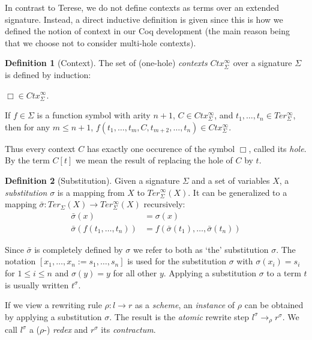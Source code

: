 \documentclass[11pt,oneside,a4paper,final]{report}
\theoremstyle{definition}
\newtheorem{definition}{Definition}
\begin{document}
In contrast to Terese, we do not define contexts as terms over an extended
signature. Instead, a direct inductive definition is given since this is how
we defined the notion of context in our Coq development (the main reason being
that we choose not to consider multi-hole contexts).

\begin{definition}[Context]
The set of (one-hole) \emph{contexts} $Ctx_\Sigma^\infty$ over a signature
$\Sigma$ is defined by induction:
\begin{compactenum}
  \item
    $\Box \in Ctx_\Sigma^\infty$.
  \item
    If $f \in \Sigma$ is a function symbol with arity $n + 1$, $C \in
    Ctx_\Sigma^\infty$, and $t_1, \ldots, t_n \in Ter_\Sigma^\infty$, then for
    any $m \leq n + 1$, $f(t_1, \ldots, t_m, C, t_{m+2}, \ldots, t_{n}) \in
    Ctx_\Sigma^\infty$.
\end{compactenum}
\end{definition}

Thus every context $C$ has exactly one occurence of the symbol $\Box$, called
its \emph{hole}. By the term $C[t]$ we mean the result of replacing the hole
of $C$ by $t$.

\begin{definition}[Substitution]
Given a signature $\Sigma$ and a set of variables $X$, a \emph{substitution}
$\sigma$ is a mapping from $X$ to $Ter_\Sigma^\infty(X)$. It can be
generalized to a mapping $\bar{\sigma} : Ter_\Sigma(X) \rightarrow
Ter_\Sigma^\infty(X)$ recursively:
\begin{align*}
  \bar{\sigma}(x) &= \sigma(x)\\
  \bar{\sigma}(f(t_1, \ldots, t_n)) &= f(\bar{\sigma}(t_1), \ldots,
  \bar{\sigma}(t_n))
\end{align*}
\end{definition}

Since $\bar{\sigma}$ is completely defined by $\sigma$ we refer to both as
`the' substitution $\sigma$. The notation $[x_1, \ldots, x_n := s_1, \ldots,
  s_n]$ is used for the substitution $\sigma$ with $\sigma(x_i) = s_i$ for $1
\leq i \leq n$ and $\sigma(y) = y$ for all other $y$. Applying a substitution
$\sigma$ to a term $t$ is usually written $t^\sigma$.

If we view a rewriting rule $\rho : l \rightarrow r$ as a \emph{scheme}, an
\emph{instance} of $\rho$ can be obtained by applying a substitution
$\sigma$. The result is the \emph{atomic} rewrite step $l^\sigma
\rightarrow_\rho r^\sigma$. We call $l^\sigma$ a ($\rho$-) \emph{redex} and
$r^\sigma$ its \emph{contractum}.
\end{document}
